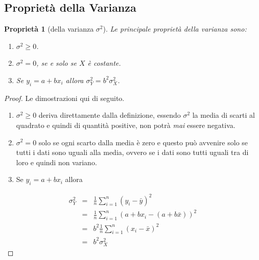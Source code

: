 \documentclass[
  11pt,
]{book}
\providecommand{\tightlist}{%
  \setlength{\itemsep}{0pt}\setlength{\parskip}{0pt}}
\theoremstyle{mytheoremstyle}
\newtheorem{proposition}{Proprietà}[section]
\theoremstyle{mydefstyle}
\begin{document}
\subsection{Proprietà della Varianza}\label{proprietuxe0-della-varianza}

\begin{info}

\begin{proposition}[della varianza $\sigma^{2}$]

Le principale proprietà della varianza sono:

\begin{enumerate}
\def\labelenumi{\arabic{enumi}.}
\tightlist
\item
  \(\sigma^{2} \ge 0\).
\item
  \(\sigma^{2}=0\), se e solo se \(X\) è costante.
\item
  Se \(y_i=a+bx_i\) allora \(\sigma^{2}_Y = b^{2} \sigma^{2}_X\).
\end{enumerate}

\end{proposition}

\end{info}

\begin{proof}
Le dimostrazioni qui di seguito.

\begin{enumerate}
\def\labelenumi{\arabic{enumi}.}
\item
  \(\sigma^{2} \ge 0\) deriva direttamente dalla definizione, essendo \(\sigma^{2}\)
  la media di scarti al quadrato e quindi di quantità positive, non potrà \emph{mai} essere negativa.
\item
  \(\sigma^{2}=0\) solo se ogni scarto dalla media è zero e questo può avvenire solo se tutti
  i dati sono uguali alla media, ovvero se i dati sono tutti uguali tra di loro e quindi non variano.
\item
  Se \(y_i=a+bx_i\) allora
\end{enumerate}

\begin{eqnarray*}
\sigma^{2}_Y   &=&  \frac 1n \sum_{i=1}^n(y_i-\bar y)^2\\
&=& \frac 1n \sum_{i=1}^n(a+bx_i-(a+b\bar x))^2\\
&=& b^2\frac 1n \sum_{i=1}^n(x_i-\bar x)^2\\
&=& b^2\sigma_X^2
\end{eqnarray*}
\end{proof}
\end{document}
